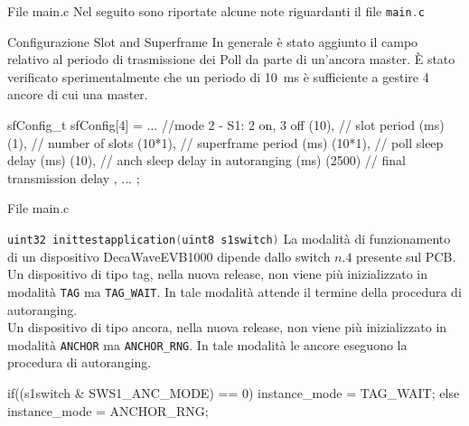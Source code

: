 \begin{frame}[fragile, shrink=15]{File main.c}
  Nel seguito sono riportate alcune note riguardanti il file \lstinline[language=C]!main.c!
  \begin{block}{Configurazione Slot and Superframe}
    In generale è stato aggiunto il campo relativo al periodo di trasmissione dei Poll
    da parte di un'ancora master. È stato verificato sperimentalmente che un periodo di \SI{10}{\milli\second} è
    sufficiente a gestire 4 ancore di cui una master.\\
    \begin{C}
      sfConfig_t sfConfig[4] =
      {
      ...
      //mode 2 - S1: 2 on, 3 off
      {
        (10),   // slot period (ms)
        (1),    // number of slots
        (10*1), // superframe period (ms)
        (10*1), // poll sleep delay (ms)
        (10),   // anch sleep delay in autoranging (ms)
        (2500)  // final transmission delay
      },
      ...
    };
  \end{C}
  \end{block}
\end{frame}

\begin{frame}[fragile, shrink=15]{File main.c}
  \begin{block}{\lstinline[language=C]!uint32 inittestapplication(uint8 s1switch)!}
    La modalità di funzionamento di un dispositivo DecaWaveEVB1000 dipende
    dallo switch $n.4$ presente sul PCB.\\
    Un dispositivo di tipo tag, nella nuova release, non viene più inizializzato in modalità
    \lstinline[language=C]!TAG! ma \lstinline[language=C]!TAG_WAIT!. In tale modalità attende il termine della procedura
    di autoranging.\\
    Un dispositivo di tipo ancora, nella nuova release, non viene più inizializzato in modalità
    \lstinline[language=C]!ANCHOR! ma \lstinline[language=C]!ANCHOR_RNG!. In tale modalità le ancore eseguono la procedura
    di autoranging.
    \begin{C}
    if((s1switch & SWS1_ANC_MODE) == 0)
    {
      instance_mode = TAG_WAIT;
    }
    else
    {
      instance_mode = ANCHOR_RNG;
    }
    \end{C}
  \end{block}
\end{frame}

